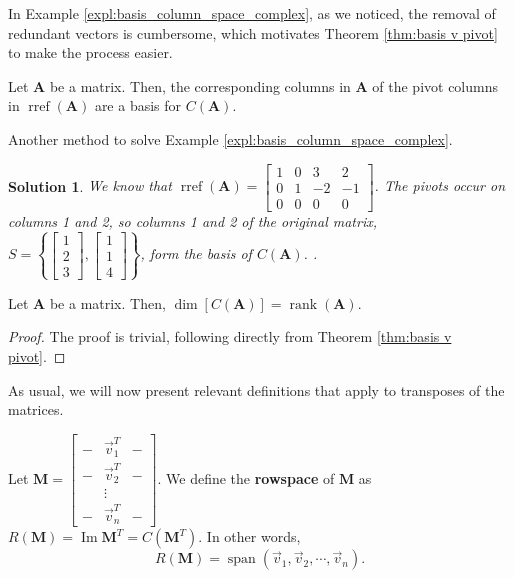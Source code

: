 \documentclass[]{book}
\DeclareMathOperator{\rref}{rref}
\DeclareMathOperator{\vecspan}{span}
\DeclareMathOperator{\spacedim}{dim}
\DeclareMathOperator{\rank}{rank}
\DeclareMathOperator{\image}{Im}
\newcommand{\mat}[1]{\ensuremath{\mathbf{#1}}}
\newtheorem*{solution}{Solution}
\begin{document}
In Example \ref{expl:basis_column_space_complex}, as we noticed, the removal of redundant vectors is cumbersome, which motivates Theorem \ref{thm:basis v pivot} to make the process easier.
\begin{theorem}
\label{thm:basis v pivot}
Let $\mat{A}$ be a matrix. Then, the corresponding columns in $\mat{A}$ of the pivot columns in $\rref(\mat{A})$ are a basis for $C(\mat{A})$.
\end{theorem}
\begin{example}
    \label{expl:basis_column_space_simple}
    Another method to solve Example \ref{expl:basis_column_space_complex}.
\begin{solution}
    We know that $\rref(\mat{A})=\begin{bmatrix}\boxed{1} & 0 & 3 & 2 \\ 0 & \boxed{1} & -2 & -1 \\ 0 & 0 & 0 & 0\end{bmatrix}$. The pivots occur on columns 1 and 2, so columns 1 and 2 of the original matrix, $S=\left\{\begin{bmatrix}1 \\2\\3\end{bmatrix},\begin{bmatrix}1\\1\\4\end{bmatrix}\right\}$, form the basis of $C(\mat{A})$. \hfill \qedsymbol.
\end{solution}
\end{example}
\begin{theorem}
    \label{thm: dimension v.s. rank}
    Let $\mat{A}$ be a matrix. Then, $\spacedim\left[C(\mat{A})\right] = \rank(\mat{A})$.
\begin{proof}
    The proof is trivial, following directly from Theorem \ref{thm:basis v pivot}.
\end{proof}
\end{theorem}

As usual, we will now present relevant definitions that apply to transposes of the matrices.

\begin{definition}[rowspace]
    \label{defn: rowspace}
    Let $\mat{M} = \begin{bmatrix} - & \vec{v}_1^T & - \\ - & \vec{v}_2^T & - \\ & \vdots & \\ - & \vec{v}_n^T & - \end{bmatrix}$. We define the \textbf{rowspace} of $\mat{M}$ as $R(\mat{M}) = \image\mat{M}^T = C(\mat{M}^T)$. In other words, 
    \[R(\mat{M}) = \vecspan(\vec{v}_1,\vec{v}_2,\cdots,\vec{v}_n).\]
\end{definition}
\end{document}
